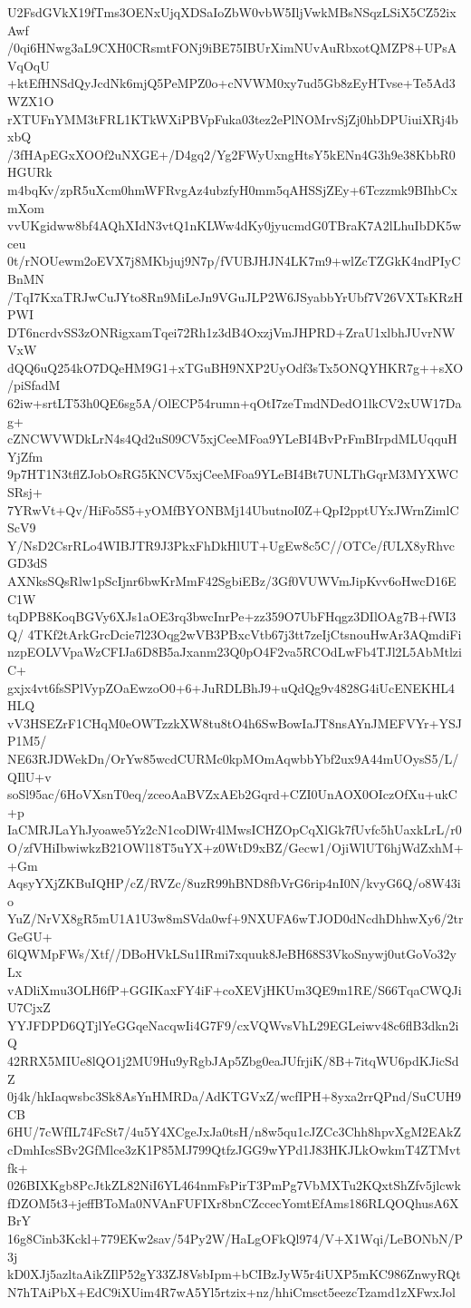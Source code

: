 U2FsdGVkX19fTms3OENxUjqXDSaIoZbW0vbW5IljVwkMBsNSqzLSiX5CZ52ixAwf
/0qi6HNwg3aL9CXH0CRsmtFONj9iBE75IBUrXimNUvAuRbxotQMZP8+UPsAVqOqU
+ktEfHNSdQyJcdNk6mjQ5PeMPZ0o+cNVWM0xy7ud5Gb8zEyHTvse+Te5Ad3WZX1O
rXTUFnYMM3tFRL1KTkWXiPBVpFuka03tez2ePlNOMrvSjZj0hbDPUiuiXRj4bxbQ
/3fHApEGxXOOf2uNXGE+/D4gq2/Yg2FWyUxngHtsY5kENn4G3h9e38KbbR0HGURk
m4bqKv/zpR5uXcm0hmWFRvgAz4ubzfyH0mm5qAHSSjZEy+6Tczzmk9BIhbCxmXom
vvUKgidww8bf4AQhXIdN3vtQ1nKLWw4dKy0jyucmdG0TBraK7A2lLhuIbDK5wceu
0t/rNOUewm2oEVX7j8MKbjuj9N7p/fVUBJHJN4LK7m9+wlZcTZGkK4ndPIyCBnMN
/TqI7KxaTRJwCuJYto8Rn9MiLeJn9VGuJLP2W6JSyabbYrUbf7V26VXTsKRzHPWI
DT6ncrdvSS3zONRigxamTqei72Rh1z3dB4OxzjVmJHPRD+ZraU1xlbhJUvrNWVxW
dQQ6uQ254kO7DQeHM9G1+xTGuBH9NXP2UyOdf3sTx5ONQYHKR7g++sXO/piSfadM
62iw+srtLT53h0QE6sg5A/OlECP54rumn+qOtI7zeTmdNDedO1lkCV2xUW17Dag+
cZNCWVWDkLrN4s4Qd2uS09CV5xjCeeMFoa9YLeBI4BvPrFmBIrpdMLUqquHYjZfm
9p7HT1N3tflZJobOsRG5KNCV5xjCeeMFoa9YLeBI4Bt7UNLThGqrM3MYXWCSRsj+
7YRwVt+Qv/HiFo5S5+yOMfBYONBMj14UbutnoI0Z+QpI2pptUYxJWrnZimlCScV9
Y/NsD2CsrRLo4WIBJTR9J3PkxFhDkHlUT+UgEw8c5C//OTCe/fULX8yRhvcGD3dS
AXNksSQsRlw1pScIjnr6bwKrMmF42SgbiEBz/3Gf0VUWVmJipKvv6oHwcD16EC1W
tqDPB8KoqBGVy6XJs1aOE3rq3bwcInrPe+zz359O7UbFHqgz3DIlOAg7B+fWI3Q/
4TKf2tArkGrcDcie7l23Oqg2wVB3PBxcVtb67j3tt7zeIjCtsnouHwAr3AQmdiFi
nzpEOLVVpaWzCFIJa6D8B5aJxanm23Q0pO4F2va5RCOdLwFb4TJl2L5AbMtlziC+
gxjx4vt6fsSPlVypZOaEwzoO0+6+JuRDLBhJ9+uQdQg9v4828G4iUcENEKHL4HLQ
vV3HSEZrF1CHqM0eOWTzzkXW8tu8tO4h6SwBowIaJT8nsAYnJMEFVYr+YSJP1M5/
NE63RJDWekDn/OrYw85wcdCURMc0kpMOmAqwbbYbf2ux9A44mUOysS5/L/QIlU+v
soSl95ac/6HoVXsnT0eq/zceoAaBVZxAEb2Gqrd+CZI0UnAOX0OIczOfXu+ukC+p
IaCMRJLaYhJyoawe5Yz2cN1coDlWr4lMwsICHZOpCqXlGk7fUvfc5hUaxkLrL/r0
O/zfVHiIbwiwkzB21OWl18T5uYX+z0WtD9xBZ/Gecw1/OjiWlUT6hjWdZxhM++Gm
AqsyYXjZKBuIQHP/cZ/RVZc/8uzR99hBND8fbVrG6rip4nI0N/kvyG6Q/o8W43io
YuZ/NrVX8gR5mU1A1U3w8mSVda0wf+9NXUFA6wTJOD0dNcdhDhhwXy6/2trGeGU+
6lQWMpFWs/Xtf//DBoHVkLSu1IRmi7xquuk8JeBH68S3VkoSnywj0utGoVo32yLx
vADliXmu3OLH6fP+GGIKaxFY4iF+coXEVjHKUm3QE9m1RE/S66TqaCWQJiU7CjxZ
YYJFDPD6QTjlYeGGqeNacqwIi4G7F9/cxVQWvsVhL29EGLeiwv48c6flB3dkn2iQ
42RRX5MIUe8lQO1j2MU9Hu9yRgbJAp5Zbg0eaJUfrjiK/8B+7itqWU6pdKJicSdZ
0j4k/hkIaqwsbc3Sk8AsYnHMRDa/AdKTGVxZ/wcfIPH+8yxa2rrQPnd/SuCUH9CB
6HU/7cWfIL74FcSt7/4u5Y4XCgeJxJa0tsH/n8w5qu1cJZCc3Chh8hpvXgM2EAkZ
cDmhIcsSBv2GfMlce3zK1P85MJ799QtfzJGG9wYPd1J83HKJLkOwkmT4ZTMvtfk+
026BIXKgb8PcJtkZL82NiI6YL464nmFsPirT3PmPg7VbMXTu2KQxtShZfv5jlcwk
fDZOM5t3+jeffBToMa0NVAnFUFIXr8bnCZccecYomtEfAms186RLQOQhusA6XBrY
16g8Cinb3Kckl+779EKw2sav/54Py2W/HaLgOFkQl974/V+X1Wqi/LeBONbN/P3j
kD0XJj5azltaAikZIlP52gY33ZJ8VsbIpm+bCIBzJyW5r4iUXP5mKC986ZnwyRQt
N7hTAiPbX+EdC9iXUim4R7wA5Yl5rtzix+nz/hhiCmsct5eezcTzamd1zXFwxJol
